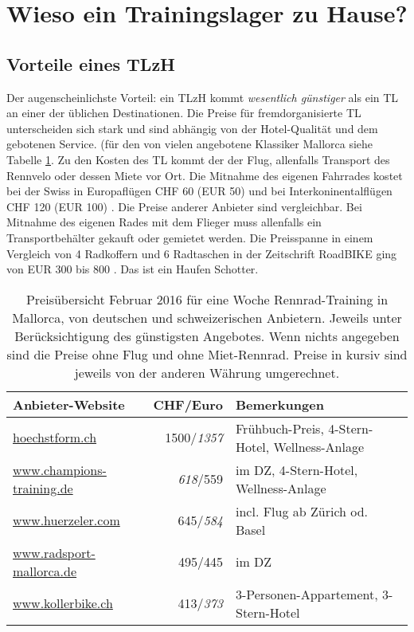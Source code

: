 \documentclass[a4paper,DIV13,BCOR0cm]{scrartcl}
\newcommand{\rv}{Rennvelo}
\newcommand{\tlzh}{TLzH}
\begin{document}

\section{Wieso ein Trainingslager zu Hause?}
\label{sec:wiesozuhause}

\subsection{Vorteile eines \tlzh}

Der augenscheinlichste Vorteil:
ein \tlzh{} kommt \emph{wesentlich günstiger} als ein TL an einer der üblichen Destinationen.
Die Preise für fremdorganisierte TL unterscheiden sich stark
und sind abhängig von der Hotel-Qualität und dem gebotenen Service.
(für den von vielen angebotene Klassiker Mallorca siehe Tabelle \ref{tab:preisvergleich}.
Zu den Kosten des TL kommt der der Flug, allenfalls Transport des \rv{} oder dessen Miete vor Ort.
Die Mitnahme des eigenen Fahrrades kostet bei der Swiss in Europaflügen CHF 60 (EUR 50) und bei Interkoninentalflügen CHF 120 (EUR 100)
\cite{swiss2016fahrradmitnahme}. Die Preise anderer Anbieter sind vergleichbar.
Bei Mitnahme des eigenen Rades mit dem Flieger muss allenfalls ein Transportbehälter gekauft oder gemietet werden.
Die Preisspanne in einem Vergleich von 4 Radkoffern und 6 Radtaschen in der Zeitschrift RoadBIKE ging von EUR 300 bis 800
\cite{Brunker2015radkoffer}.
Das ist ein Haufen Schotter.

\begin{table}
  \centering
  \begin{tabular}{lrl}
    \toprule
        Anbieter-Website & CHF/Euro & Bemerkungen \\
    \midrule
        \url{hoechstform.ch} & 1500/\textsl{1357} & Frühbuch-Preis, 4-Stern-Hotel, Wellness-Anlage \\
        \url{www.champions-training.de} & \textsl{618}/559 & im DZ, 4-Stern-Hotel, Wellness-Anlage \\
        \url{www.huerzeler.com} & 645/\textsl{584} & incl. Flug ab Zürich od. Basel\\
        \url{www.radsport-mallorca.de} & 495/445 & im DZ \\
        \url{www.kollerbike.ch} & 413/\textsl{373} & 3-Personen-Appartement, 3-Stern-Hotel \\
    \bottomrule
  \end{tabular}
  \caption{Preisübersicht Februar 2016 für eine Woche Rennrad-Training in Mallorca,
    von deutschen und schweizerischen Anbietern.
    Jeweils unter Berücksichtigung des günstigsten Angebotes.
    Wenn nichts angegeben sind die Preise ohne Flug und ohne Miet-Rennrad.
  Preise in kursiv sind jeweils von der anderen Währung umgerechnet.}
  \label{tab:preisvergleich}
\end{table}
\end{document}
